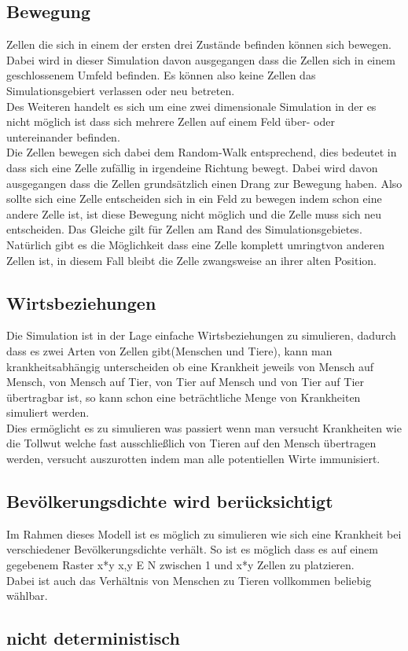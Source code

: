 \subsection{Bewegung}
Zellen die sich in einem der ersten drei Zustände befinden können sich bewegen. Dabei wird in dieser Simulation davon ausgegangen dass die Zellen sich in einem geschlossenem Umfeld befinden. Es können also keine Zellen das Simulationsgebiert verlassen oder neu betreten.\\
Des Weiteren handelt es sich um eine zwei dimensionale Simulation in der es nicht möglich ist dass sich mehrere Zellen auf einem Feld über- oder untereinander befinden.\\
Die Zellen bewegen sich dabei dem Random-Walk entsprechend, dies bedeutet in dass sich eine Zelle zufällig in irgendeine Richtung bewegt. Dabei wird davon ausgegangen dass die Zellen grundsätzlich einen Drang zur Bewegung haben. Also sollte sich eine Zelle entscheiden sich in ein Feld zu bewegen indem schon eine andere Zelle ist, ist diese Bewegung nicht möglich und die Zelle muss sich neu entscheiden. Das Gleiche gilt für Zellen am Rand des Simulationsgebietes. Natürlich gibt es die Möglichkeit dass eine Zelle komplett \glqq umringt\grqq von anderen Zellen ist, in diesem Fall bleibt die Zelle zwangsweise an ihrer alten Position.
\subsection{Wirtsbeziehungen}
Die Simulation ist in der Lage einfache Wirtsbeziehungen zu simulieren, dadurch dass es zwei Arten von Zellen gibt(Menschen und Tiere), kann man krankheitsabhängig unterscheiden ob eine Krankheit jeweils von Mensch auf Mensch, von Mensch auf Tier, von Tier auf Mensch und von Tier auf Tier übertragbar ist, so kann schon eine beträchtliche Menge von Krankheiten simuliert werden.\\
Dies ermöglicht es zu simulieren was passiert wenn man versucht Krankheiten wie die Tollwut welche fast ausschließlich von Tieren auf den Mensch übertragen werden, versucht auszurotten indem man alle potentiellen Wirte immunisiert.

\subsection{Bevölkerungsdichte wird berücksichtigt}
Im Rahmen dieses Modell ist es möglich zu simulieren wie sich eine Krankheit bei verschiedener Bevölkerungsdichte verhält. So ist es möglich dass es auf einem gegebenem Raster x*y x,y E N zwischen 1 und x*y Zellen zu platzieren.\\
Dabei ist auch das Verhältnis von Menschen zu Tieren vollkommen beliebig wählbar.

\subsection{nicht deterministisch}

%
%
%
%
%
